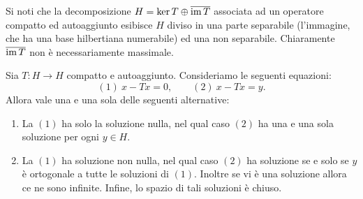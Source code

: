 \begin{remark}
	Si noti che la decomposizione $H = \ker T \oplus \overline{\operatorname{im} T}$ associata ad un operatore compatto ed autoaggiunto esibisce $H$ diviso in una parte separabile (l'immagine, che ha una base hilbertiana numerabile) ed una non separabile. Chiaramente $\overline{\operatorname{im} T}$ non è necessariamente massimale.
\end{remark}

\begin{theorem}
	Sia $T:H \to H$ compatto e autoaggiunto. Consideriamo le seguenti equazioni:
	\begin{equation*}
		(1)\ x - Tx = 0, \qquad (2)\ x-Tx = y.
	\end{equation*}
	Allora vale una e una sola delle seguenti alternative:
	\begin{enumerate}
		\item La $(1)$ ha solo la soluzione nulla, nel qual caso $(2)$ ha una e una sola soluzione per ogni $y \in H$.
		\item La $(1)$ ha soluzione non nulla, nel qual caso $(2)$ ha soluzione se e solo se $y$ è ortogonale a tutte le soluzioni di $(1)$.
		Inoltre se vi è una soluzione allora ce ne sono infinite.
		Infine, lo spazio di tali soluzioni è chiuso.
	\end{enumerate}
\end{theorem}
